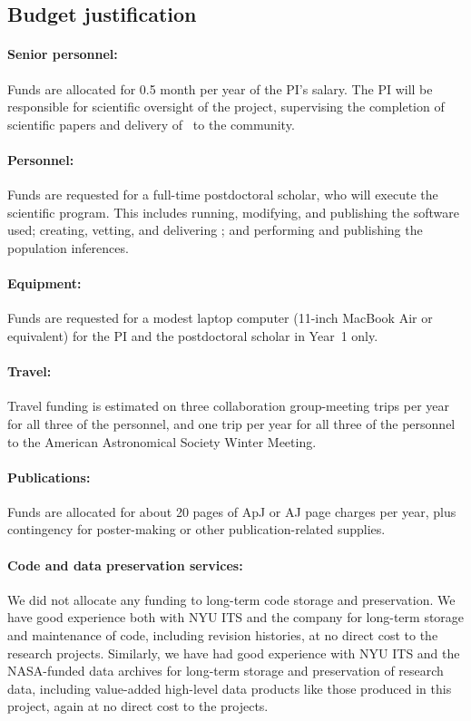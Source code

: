 \documentclass[12pt]{article}
\begin{document}
\subsection*{Budget justification}

\paragraph{Senior personnel:}
Funds are allocated for 0.5 month per year of the PI's salary.
The PI will be responsible for scientific oversight of the project,
supervising the completion of scientific papers and delivery of
\catalogname\ to the community.

\paragraph{Personnel:}
Funds are requested for a full-time postdoctoral scholar, who will
execute the scientific program.
This includes running, modifying, and publishing the software used;
creating, vetting, and delivering \catalogname;
and performing and publishing the population inferences.

\paragraph{Equipment:}
Funds are requested for a modest laptop computer (11-inch MacBook Air
or equivalent) for the PI and the postdoctoral scholar in Year~1 only.

\paragraph{Travel:}
Travel funding is estimated on three collaboration group-meeting trips
per year for all three of the personnel, and one trip per year for all
three of the personnel to the American Astronomical Society Winter
Meeting.

\paragraph{Publications:}
Funds are allocated for about 20 pages of ApJ or AJ page charges per
year, plus contingency for poster-making or other publication-related
supplies.

\paragraph{Code and data preservation services:}
We did not allocate any funding to long-term code storage and
preservation.
We have good experience both with NYU ITS and the company
 for long-term storage and maintenance of code,
including revision histories, at no direct cost to the research
projects.
Similarly, we have had good experience with NYU ITS and the
NASA-funded data archives for long-term storage and preservation
of research data, including value-added high-level data products
like those produced in this project, again at no direct cost to
the projects.
\end{document}
